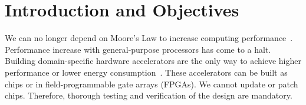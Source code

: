 \documentclass[fleqn,12pt]{article}
\begin{document}
%
%
%
%
%



\section{Introduction and Objectives}
\label{sec:objectives}

We can no longer depend on Moore's Law to increase computing performance~\cite{dark-silicon:2011}.
Performance increase with general-purpose processors has come to a halt.
Building domain-specific hardware accelerators are the only way to achieve
higher performance or lower energy consumption~\cite{domain-hw-acc:2020}.
These accelerators can be built as chips or in field-programmable gate arrays (FPGAs).
We cannot update or patch chips. Therefore, thorough testing and verification of the design are mandatory.
\end{document}
